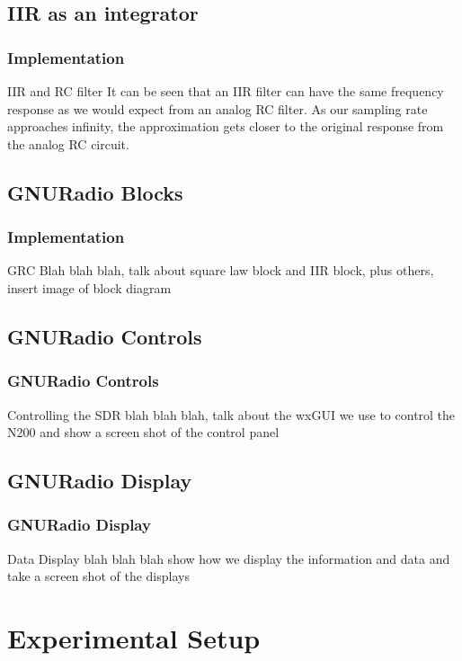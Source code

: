 \documentclass{beamer}
\begin{document}
\subsection{IIR as an integrator}
\begin{frame}
\frametitle{Implementation}
\begin{block}{IIR and RC filter}
It can be seen that an IIR filter can have the same frequency response as we would expect from an analog RC filter.  As our sampling rate approaches infinity, the approximation gets closer to the original response from the analog RC circuit.  
\end{block}
\end{frame}

\subsection{GNURadio Blocks}
\begin{frame}
\frametitle{Implementation}
\begin{block}{GRC}
Blah blah blah, talk about square law block and IIR block, plus others, insert image of block diagram
\end{block}
\end{frame}

\subsection{GNURadio Controls}
\begin{frame}
\frametitle{GNURadio Controls}
\begin{block}{Controlling the SDR}
blah blah blah, talk about the wxGUI we use to control the N200 and show a screen shot of the control panel
\end{block}
\end{frame}

\subsection{GNURadio Display}
\begin{frame}
\frametitle{GNURadio Display}
\begin{block}{Data Display}
blah blah blah show how we display the information and data and take a screen shot of the displays
\end{block}
\end{frame}
\section{Experimental Setup}
\end{document}
